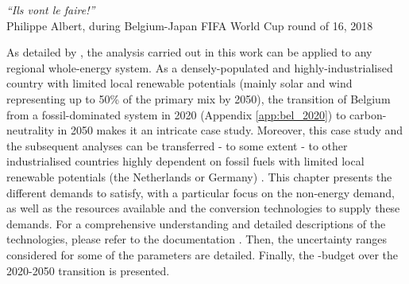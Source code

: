 \vspace{-0.2cm}
\begin{flushright}
\emph{``Ils vont le faire!''}\\
Philippe Albert, during Belgium-Japan FIFA World Cup round of 16, 2018
\end{flushright}
\vspace{0.4cm}
%
%
%

As detailed by \citet{limpens2024pathway}, the analysis carried out in this work can be applied to any regional whole-energy system. As a densely-populated and highly-industrialised country with limited local renewable potentials (\ie mainly solar and wind representing up to 50\% of the primary mix by 2050), the transition of Belgium from a fossil-dominated system in 2020 (Appendix \ref{app:bel_2020}) to carbon-neutrality in 2050 makes it an intricate case study. Moreover, this case study and the subsequent analyses can be transferred - to some extent - to other industrialised countries highly dependent on fossil fuels with limited local renewable potentials (\eg the Netherlands or Germany) \cite{dommisse2020modelling}. This chapter presents the different demands to satisfy, with a particular focus on the non-energy demand, as well as the resources available and the conversion technologies to supply these demands. For a comprehensive understanding and detailed descriptions of the technologies, please refer to the documentation \cite{readthedocs_pathway}. Then, the uncertainty ranges considered for some of the parameters are detailed. Finally, the -budget over the 2020-2050 transition is presented.

